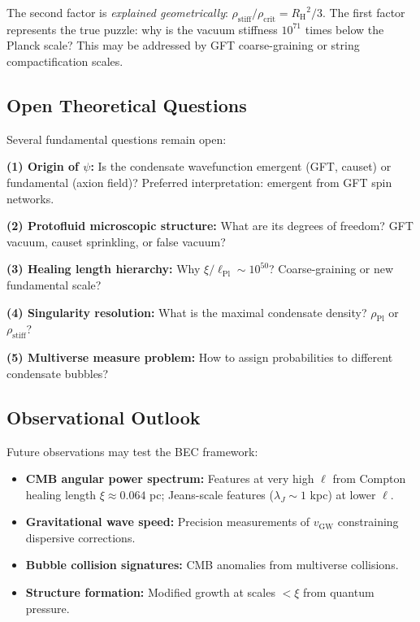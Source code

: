 \documentclass[11pt,a4paper]{article}
\newcommand{\lPl}{\ensuremath{\ell_{\mathrm{Pl}}}}
\newcommand{\rhocrit}{\ensuremath{\rho_{\mathrm{crit}}}}
\newcommand{\rhostiff}{\ensuremath{\rho_{\mathrm{stiff}}}}
\newcommand{\rhoPl}{\ensuremath{\rho_{\mathrm{Pl}}}}
\newcommand{\RH}{\ensuremath{R_{\mathrm{H}}}}
\theoremstyle{definition}
\theoremstyle{remark}
\begin{document}
The second factor is \emph{explained geometrically}: $\rhostiff/\rhocrit = \RH^2/3$. The first factor represents the true puzzle: why is the vacuum stiffness $10^{71}$ times below the Planck scale? This may be addressed by GFT coarse-graining or string compactification scales.

\subsection{Open Theoretical Questions}
\label{sec:open_theoretical}

Several fundamental questions remain open:

\textbf{(1) Origin of $\psi$:} Is the condensate wavefunction emergent (GFT, causet) or fundamental (axion field)? Preferred interpretation: emergent from GFT spin networks.

\textbf{(2) Protofluid microscopic structure:} What are its degrees of freedom? GFT vacuum, causet sprinkling, or false vacuum?

\textbf{(3) Healing length hierarchy:} Why $\xi/\lPl \sim 10^{50}$? Coarse-graining or new fundamental scale?

\textbf{(4) Singularity resolution:} What is the maximal condensate density? $\rhoPl$ or $\rhostiff$?

\textbf{(5) Multiverse measure problem:} How to assign probabilities to different condensate bubbles?

\subsection{Observational Outlook}
\label{sec:obs_outlook}

Future observations may test the BEC framework:
\begin{itemize}
\item \textbf{CMB angular power spectrum:} Features at very high $\ell$ from Compton healing length $\xi \approx 0.064$ pc; Jeans-scale features ($\lambda_J \sim 1$ kpc) at lower $\ell$.
\item \textbf{Gravitational wave speed:} Precision measurements of $v_{\mathrm{GW}}$ constraining dispersive corrections.
\item \textbf{Bubble collision signatures:} CMB anomalies from multiverse collisions.
\item \textbf{Structure formation:} Modified growth at scales $< \xi$ from quantum pressure.
\end{itemize}
\end{document}

